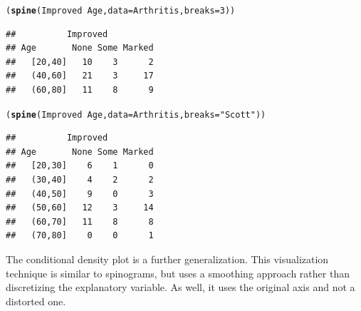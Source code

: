 \documentclass[10pt,twoside]{article}\usepackage[]{graphicx}\usepackage[]{color}
\makeatletter
\newcommand{\hlnum}[1]{\textcolor[rgb]{0.686,0.059,0.569}{#1}}%
\newcommand{\hlstr}[1]{\textcolor[rgb]{0.192,0.494,0.8}{#1}}%
\newcommand{\hlopt}[1]{\textcolor[rgb]{0,0,0}{#1}}%
\newcommand{\hlstd}[1]{\textcolor[rgb]{0.345,0.345,0.345}{#1}}%
\newcommand{\hlkwc}[1]{\textcolor[rgb]{0.333,0.667,0.333}{#1}}%
\newcommand{\hlkwd}[1]{\textcolor[rgb]{0.737,0.353,0.396}{\textbf{#1}}}%
\newenvironment{kframe}{%
 \def\at@end@of@kframe{}%
 \ifinner\ifhmode%
  \def\at@end@of@kframe{\end{minipage}}%
  \begin{minipage}{\columnwidth}%
 \fi\fi%
 \def\FrameCommand##1{\hskip\@totalleftmargin \hskip-\fboxsep
 \colorbox{shadecolor}{##1}\hskip-\fboxsep
     \hskip-\linewidth \hskip-\@totalleftmargin \hskip\columnwidth}%
 \MakeFramed {\advance\hsize-\width
   \@totalleftmargin\z@ \linewidth\hsize
   \@setminipage}}%
 {\par\unskip\endMakeFramed%
 \at@end@of@kframe}
\newenvironment{knitrout}{}{} %
\makeatother
\begin{document}
\begin{knitrout}
\color{fgcolor}\begin{kframe}
\begin{alltt}
\hlstd{(}\hlkwd{spine}\hlstd{(Improved} \hlopt{~} \hlstd{Age,} \hlkwc{data} \hlstd{= Arthritis,} \hlkwc{breaks} \hlstd{=} \hlnum{3}\hlstd{))}
\end{alltt}
\begin{verbatim}
##          Improved
## Age       None Some Marked
##   [20,40]   10    3      2
##   (40,60]   21    3     17
##   (60,80]   11    8      9
\end{verbatim}
\begin{alltt}
\hlstd{(}\hlkwd{spine}\hlstd{(Improved} \hlopt{~} \hlstd{Age,} \hlkwc{data} \hlstd{= Arthritis,} \hlkwc{breaks} \hlstd{=} \hlstr{"Scott"}\hlstd{))}
\end{alltt}
\begin{verbatim}
##          Improved
## Age       None Some Marked
##   [20,30]    6    1      0
##   (30,40]    4    2      2
##   (40,50]    9    0      3
##   (50,60]   12    3     14
##   (60,70]   11    8      8
##   (70,80]    0    0      1
\end{verbatim}
\end{kframe}
\end{knitrout}








The conditional density plot \citep{vcd:Hofmann+Theus} is a further generalization.
This visualization technique is similar to spinograms, but uses a smoothing approach
rather than discretizing the explanatory variable.  As well, it uses 
the original  axis and not a distorted one.
\end{document}
